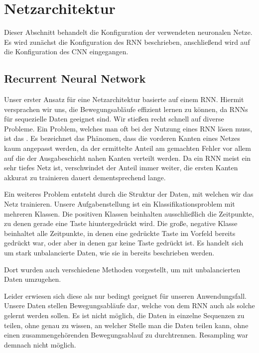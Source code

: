\section{Netzarchitektur}

Dieser Abschnitt behandelt die Konfiguration der verwendeten neuronalen Netze. Es wird zunächst die Konfiguration des RNN beschrieben, anschließend wird auf die Konfiguration des CNN eingegangen.

\subsection{Recurrent Neural Network}

Unser erster Ansatz für eine Netzarchitektur basierte auf einem RNN. Hiermit versprachen wir uns, die Bewegungsabläufe effizient lernen zu können, da RNNs für sequezielle Daten geeignet sind. Wir stießen recht schnell auf diverse Probleme.
Ein Problem, welches man oft bei der Nutzung eines RNN lösen muss, ist das  \citep{hochreiter-vanishing-gradient}. Es bezeichnet das Phänomen, dass die vorderen Kanten eines Netzes kaum angepasst werden, da der ermittelte Anteil am gemachten Fehler vor allem auf die der Ausgabeschicht nahen Kanten verteilt werden. Da ein RNN meist ein sehr tiefes Netz ist, verschwindet der Anteil immer weiter, die ersten Kanten akkurat zu trainieren dauert dementsprechend lange.

Ein weiteres Problem entsteht durch die Struktur der Daten, mit welchen wir das Netz trainieren.
Unsere Aufgabenstellung ist ein Klassifikationsproblem mit mehreren Klassen. Die positiven Klassen beinhalten ausschließlich die Zeitpunkte, zu denen gerade eine Taste hiuntergedrückt wird. Die große, negative Klasse beinhaltet alle Zeitpunkte, in denen eine gedrückte Taste im Vorfeld bereits gedrückt war, oder aber in denen gar keine Taste gedrückt ist. Es handelt sich um stark unbalancierte Daten, wie sie in  bereits beschrieben werden.

Dort wurden auch verschiedene Methoden vorgestellt, um mit unbalancierten Daten umzugehen.

Leider erwiesen sich diese als nur bedingt geeignet für unseren Anwendungsfall.
Unsere Daten stellen Bewegungsabläufe dar, welche von dem RNN auch als solche gelernt werden sollen. Es ist nicht möglich, die Daten in einzelne Sequenzen zu teilen, ohne genau zu wissen, an welcher Stelle man die Daten teilen kann, ohne einen zusammengehörenden Bewegungsablauf zu durchtrennen. Resampling war demnach nicht möglich.

